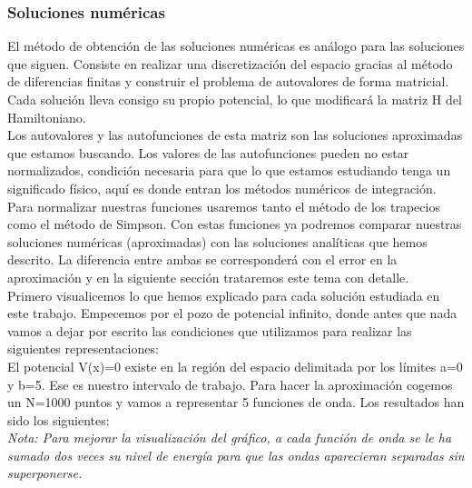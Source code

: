 \documentclass[12pt]{article}
\begin{document}
    \subsubsection{Soluciones numéricas}

    El método de obtención de las soluciones numéricas es análogo para las soluciones que siguen. Consiste en realizar una discretización del espacio gracias al método de diferencias finitas y construir el problema de autovalores de forma matricial. Cada solución lleva consigo su propio potencial, lo que modificará la matriz H del Hamiltoniano.\\

    Los autovalores y las autofunciones de esta matriz son las soluciones aproximadas que estamos buscando. Los valores de las autofunciones pueden no estar normalizados, condición necesaria para que lo que estamos estudiando tenga un significado físico, aquí es donde entran los métodos numéricos de integración.\\

    Para normalizar nuestras funciones usaremos tanto el método de los trapecios como el método de Simpson. Con estas funciones ya podremos comparar nuestras soluciones numéricas (aproximadas) con las soluciones analíticas que hemos descrito. La diferencia entre ambas se corresponderá con el error en la aproximación y en la siguiente sección trataremos este tema con detalle.\\
    
    Primero visualicemos lo que hemos explicado para cada solución estudiada en este trabajo. Empecemos por el pozo de potencial infinito, donde antes que nada vamos a dejar por escrito las condiciones que utilizamos para realizar las siguientes representaciones:\\

     El potencial V(x)=0 existe en la región del espacio delimitada por los límites a=0 y b=5. Ese es nuestro intervalo de trabajo. Para hacer la aproximación cogemos un N=1000 puntos y vamos a representar 5 funciones de onda. Los resultados han sido los siguientes:\\

     \textit{Nota: Para mejorar la visualización del gráfico, a cada función de onda se le ha sumado dos veces su nivel de energía para que las ondas aparecieran separadas sin superponerse.}
\end{document}
